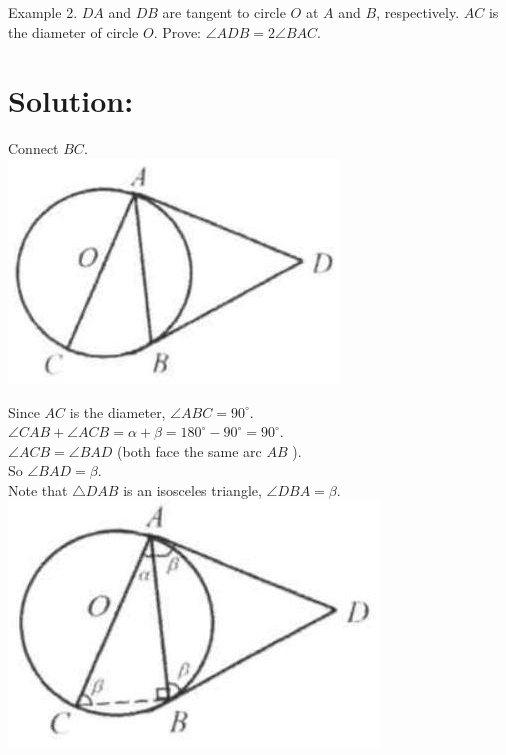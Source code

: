\documentclass[10pt]{article}
\begin{document}
Example 2. \(D A\) and \(D B\) are tangent to circle \(O\) at \(A\) and \(B\), respectively. \(A C\) is the diameter of circle \(O\). Prove: \(\angle A D B=2 \angle B A C\).

\section*{Solution:}
Connect \(B C\).\\
\includegraphics[max width=\textwidth, center]{2025_04_17_97bc1f7e44d93c271a88g-163(2)}

Since \(A C\) is the diameter, \(\angle A B C=90^{\circ}\).\\
\(\angle C A B+\angle A C B=\alpha+\beta=180^{\circ}-90^{\circ}=90^{\circ}\).\\
\(\angle A C B=\angle B A D\) (both face the same arc \(A B\) ).\\
So \(\angle B A D=\beta\).\\
Note that \(\triangle D A B\) is an isosceles triangle, \(\angle D B A=\beta\).\\
\includegraphics[max width=\textwidth, center]{2025_04_17_97bc1f7e44d93c271a88g-163(4)}
\end{document}
